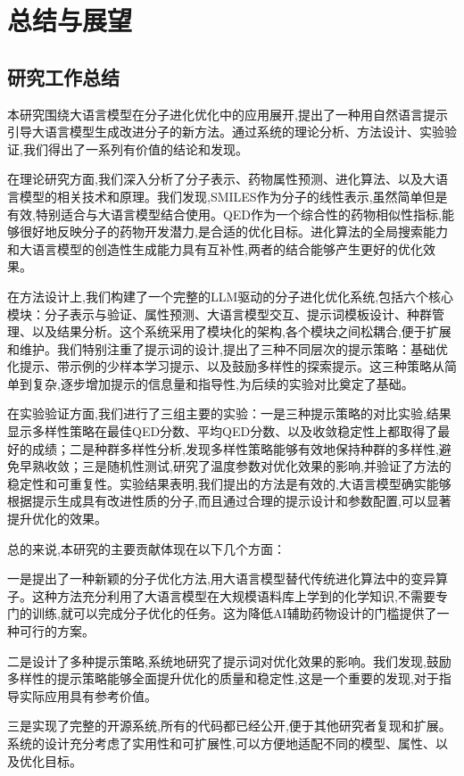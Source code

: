 \chapter{总结与展望}

\section{研究工作总结}

本研究围绕大语言模型在分子进化优化中的应用展开,提出了一种用自然语言提示引导大语言模型生成改进分子的新方法。通过系统的理论分析、方法设计、实验验证,我们得出了一系列有价值的结论和发现。

在理论研究方面,我们深入分析了分子表示、药物属性预测、进化算法、以及大语言模型的相关技术和原理。我们发现,SMILES作为分子的线性表示,虽然简单但是有效,特别适合与大语言模型结合使用。QED作为一个综合性的药物相似性指标,能够很好地反映分子的药物开发潜力,是合适的优化目标。进化算法的全局搜索能力和大语言模型的创造性生成能力具有互补性,两者的结合能够产生更好的优化效果。

在方法设计上,我们构建了一个完整的LLM驱动的分子进化优化系统,包括六个核心模块：分子表示与验证、属性预测、大语言模型交互、提示词模板设计、种群管理、以及结果分析。这个系统采用了模块化的架构,各个模块之间松耦合,便于扩展和维护。我们特别注重了提示词的设计,提出了三种不同层次的提示策略：基础优化提示、带示例的少样本学习提示、以及鼓励多样性的探索提示。这三种策略从简单到复杂,逐步增加提示的信息量和指导性,为后续的实验对比奠定了基础。

在实验验证方面,我们进行了三组主要的实验：一是三种提示策略的对比实验,结果显示多样性策略在最佳QED分数、平均QED分数、以及收敛稳定性上都取得了最好的成绩；二是种群多样性分析,发现多样性策略能够有效地保持种群的多样性,避免早熟收敛；三是随机性测试,研究了温度参数对优化效果的影响,并验证了方法的稳定性和可重复性。实验结果表明,我们提出的方法是有效的,大语言模型确实能够根据提示生成具有改进性质的分子,而且通过合理的提示设计和参数配置,可以显著提升优化的效果。

总的来说,本研究的主要贡献体现在以下几个方面：

一是提出了一种新颖的分子优化方法,用大语言模型替代传统进化算法中的变异算子。这种方法充分利用了大语言模型在大规模语料库上学到的化学知识,不需要专门的训练,就可以完成分子优化的任务。这为降低AI辅助药物设计的门槛提供了一种可行的方案。

二是设计了多种提示策略,系统地研究了提示词对优化效果的影响。我们发现,鼓励多样性的提示策略能够全面提升优化的质量和稳定性,这是一个重要的发现,对于指导实际应用具有参考价值。

三是实现了完整的开源系统,所有的代码都已经公开,便于其他研究者复现和扩展。系统的设计充分考虑了实用性和可扩展性,可以方便地适配不同的模型、属性、以及优化目标。

